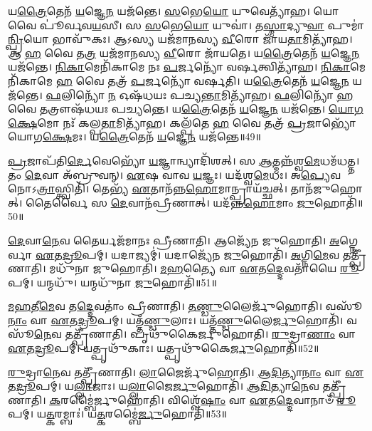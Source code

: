 𑌯\-\ul{𑌤𑍍𑌰𑍈}\-𑌤𑍇𑌨᳴ \ul{𑌯}\-𑌜𑍍𑌞𑍇\-\ul{𑌨} 𑌯𑌜᳴𑌨𑍍𑌤𑍇।
\-\ul{𑌸}\-𑌭𑍇\-\ul{𑌯𑍋} 𑌯𑍁𑌵𑍇𑌤𑍍𑌯𑌾᳴𑌹।
𑌯𑍋 𑌵𑍈 𑌪𑍂॑𑌰𑍍𑌵𑌵\-\ul{𑌯}\-𑌸𑍀।
𑌸 \ul{𑌸}\-𑌭𑍇\-\ul{𑌯𑍋} 𑌯𑍁𑌵𑌾॑।
𑌤\-\ul{𑌸𑍍𑌮𑌾}\-𑌦𑍍𑌯𑍁\-\ul{𑌵𑌾} 𑌪𑍁𑌮𑌾॑\-\ul{𑌨𑍍𑌪𑍍𑌰𑌿}\-𑌯𑍋 𑌭𑌾𑌵𑍁᳴𑌕𑌃।
𑌆𑌽𑌸𑍍𑌯 𑌯𑌜᳴𑌮𑌾𑌨𑌸𑍍𑌯 \ul{𑌵𑍀}\-𑌰𑍋 𑌜𑌾᳴𑌯\-\ul{𑌤𑌾}\-𑌮𑌿𑌤𑍍𑌯𑌾᳴𑌹।
𑌆 \ul{𑌹} 𑌵𑍈 𑌤\-\ul{𑌤𑍍𑌰} 𑌯𑌜᳴𑌮𑌾𑌨𑌸𑍍𑌯 \ul{𑌵𑍀}\-𑌰𑍋 𑌜𑌾᳴𑌯𑌤𑍇।
𑌯\-\ul{𑌤𑍍𑌰𑍈}\-𑌤𑍇𑌨᳴ \ul{𑌯}\-𑌜𑍍𑌞𑍇\-\ul{𑌨} 𑌯𑌜᳴𑌨𑍍𑌤𑍇।
\-\ul{𑌨𑌿}\-\-\ul{𑌕𑌾}\-𑌮𑍇𑌨𑌿᳴𑌕𑌾𑌮𑍇 𑌨𑌃 \ul{𑌪}\-𑌰𑍍𑌜𑌨𑍍𑌯𑍋᳴ 𑌵𑌰𑍍\mbox{}\-\ul{𑌷}\-𑌤𑍍𑌵𑌿𑌤𑍍𑌯𑌾᳴𑌹।
\-\ul{𑌨𑌿}\-\-\ul{𑌕𑌾}\-𑌮𑍇𑌨𑌿᳴𑌕𑌾𑌮𑍇 \ul{𑌹} 𑌵𑍈 𑌤𑌤𑍍𑌰᳴ \ul{𑌪}\-𑌰𑍍𑌜𑌨𑍍𑌯𑍋᳴ 𑌵𑌰𑍍\mbox{}𑌷𑌤𑌿।
𑌯\-\ul{𑌤𑍍𑌰𑍈}\-𑌤𑍇𑌨᳴ \ul{𑌯}\-𑌜𑍍𑌞𑍇\-\ul{𑌨} 𑌯𑌜᳴𑌨𑍍𑌤𑍇।
\-\ul{𑌫}\-𑌲𑌿𑌨𑍍𑌯𑍋᳴ \ul{𑌨} 𑌓𑌷᳴𑌧𑌯𑌃 𑌪𑌚𑍍𑌯\-\ul{𑌨𑍍𑌤𑌾}\-𑌮𑌿𑌤𑍍𑌯𑌾᳴𑌹।
\-\ul{𑌫}\-𑌲𑌿𑌨𑍍𑌯𑍋᳴ \ul{𑌹} 𑌵𑍈 𑌤𑌤𑍍𑌰𑍗𑌷᳴𑌧𑌯𑌃 𑌪𑌚𑍍𑌯𑌨𑍍𑌤𑍇।
𑌯\-\ul{𑌤𑍍𑌰𑍈}\-𑌤𑍇𑌨᳴ \ul{𑌯}\-𑌜𑍍𑌞𑍇\-\ul{𑌨} 𑌯𑌜᳴𑌨𑍍𑌤𑍇।
\-\ul{𑌯𑍋}\-\-\ul{𑌗}\-\-\ul{𑌕𑍍𑌷𑍇}\-𑌮𑍋 𑌨𑌃᳴ 𑌕𑌲𑍍𑌪\-\ul{𑌤𑌾}\-𑌮𑌿𑌤𑍍𑌯𑌾᳴𑌹।
𑌕𑌲𑍍𑌪᳴𑌤𑍇 \ul{𑌹} 𑌵𑍈 𑌤𑌤𑍍𑌰᳴ \ul{𑌪𑍍𑌰}\-𑌜𑌾𑌭𑍍𑌯𑍋᳴ 𑌯𑍋𑌗\-\ul{𑌕𑍍𑌷𑍇}\-𑌮𑌃।
𑌯\-\ul{𑌤𑍍𑌰𑍈}\-𑌤𑍇𑌨᳴ \ul{𑌯}\-𑌜𑍍𑌞𑍇\-\ul{𑌨} 𑌯𑌜᳴𑌨𑍍𑌤𑍇॥49॥\anuvakamend[\-\ul{𑌅}\-\-\ul{𑌨}\-𑌡𑍍𑌵𑌾𑌨𑌿𑌤𑍍𑌯𑌾᳴𑌹 𑌜𑌾𑌯𑌤𑍇 𑌵𑌰𑍍‌\mbox{}𑌷𑌤𑌿 \ul{𑌸}\-𑌪𑍍𑌤 𑌚᳴]

\-\ul{𑌪𑍍𑌰}\-𑌜𑌾𑌪᳴𑌤𑌿\-\ul{𑌰𑍍𑌦𑍇}\-𑌵𑍇𑌭𑍍𑌯𑍋᳴ \ul{𑌯}\-𑌜𑍍𑌞𑌾𑌨𑍍𑌵𑍍𑌯𑌾𑌦𑌿᳴𑌶𑌤𑍍।
𑌸 \ul{𑌆}\-𑌤𑍍𑌮𑌨𑍍𑌨᳴𑌶𑍍𑌵\-\ul{𑌮𑍇}\-𑌧𑌮᳴𑌧𑌤𑍍𑌤।
𑌤𑌂 \ul{𑌦𑍇}\-𑌵𑌾 𑌅᳴𑌬𑍍𑌰𑍁𑌵𑌨𑍍।
\-\ul{𑌏}\-𑌷 𑌵𑌾𑌵 \ul{𑌯}\-𑌜𑍍𑌞𑌃।
𑌯𑌦᳴𑌶𑍍𑌵\-\ul{𑌮𑍇}\-𑌧𑌃।
𑌅\-\ul{𑌪𑍍𑌯𑍇}\-𑌵 𑌨𑍋𑌽\-\ul{𑌤𑍍𑌰𑌾}\-𑌸𑍍𑌤𑍍𑌵𑌿𑌤𑌿᳴।
𑌤𑍇𑌭𑍍𑌯᳴ \ul{𑌏}\-𑌤𑌾𑌨᳴𑌨𑍍𑌨\-\ul{𑌹𑍋}\-𑌮𑌾𑌨𑍍𑌪𑍍𑌰𑌾𑌯᳴𑌚𑍍𑌛𑌤𑍍।
𑌤𑌾𑌨᳴𑌜𑍁𑌹𑍋𑌤𑍍।
𑌤𑍈𑌰𑍍𑌵𑍈 𑌸 \ul{𑌦𑍇}\-𑌵𑌾𑌨᳴𑌪𑍍𑌰𑍀𑌣𑌾𑌤𑍍।
𑌯𑌦᳴𑌨𑍍𑌨\-\ul{𑌹𑍋}\-𑌮𑌾𑌂 \ul{𑌜𑍁}\-𑌹𑍋𑌤𑌿᳴॥50॥

\-\ul{𑌦𑍇}\-𑌵𑌾\-\ul{𑌨𑍇}\-𑌵 𑌤𑍈𑌰𑍍𑌯𑌜᳴𑌮𑌾𑌨𑌃 𑌪𑍍𑌰𑍀𑌣𑌾𑌤𑌿।
𑌆𑌜𑍍𑌯𑍇᳴𑌨 𑌜𑍁𑌹𑍋𑌤𑌿।
\-\ul{𑌅}\-𑌗𑍍𑌨𑍇𑌰𑍍𑌵𑌾 \ul{𑌏}\-𑌤\-\ul{𑌦𑍍𑌰𑍂}\-𑌪𑌮𑍍।
𑌯𑌦𑌾𑌜𑍍𑌯𑌮𑍍॑।
𑌯𑌦𑌾𑌜𑍍𑌯𑍇᳴𑌨 \ul{𑌜𑍁}\-𑌹𑍋𑌤𑌿᳴।
\-\ul{𑌅}\-𑌗𑍍𑌨𑌿\-\ul{𑌮𑍇}\-𑌵 𑌤𑌤𑍍𑌪𑍍𑌰𑍀᳴𑌣𑌾𑌤𑌿।
𑌮𑌧𑍁᳴𑌨𑌾 𑌜𑍁𑌹𑍋𑌤𑌿।
\-\ul{𑌮}\-\-\ul{𑌹}\-𑌤𑍍𑌯𑍈 𑌵𑌾 \ul{𑌏}\-𑌤\-\ul{𑌦𑍍𑌦𑍇}\-𑌵𑌤𑌾᳴𑌯𑍈 \ul{𑌰𑍂}\-𑌪𑌮𑍍।
𑌯𑌨𑍍𑌮𑌧𑍁᳴।
𑌯𑌨𑍍𑌮𑌧𑍁᳴𑌨𑌾 \ul{𑌜𑍁}\-𑌹𑍋𑌤𑌿᳴॥51॥

\-\ul{𑌮}\-\-\ul{𑌹}\-𑌤𑍀\-\ul{𑌮𑍇}\-𑌵 𑌤\-\ul{𑌦𑍍𑌦𑍇}\-𑌵𑌤𑌾𑌂॑ 𑌪𑍍𑌰𑍀𑌣𑌾𑌤𑌿।
\-\ul{𑌤}\-\-\ul{𑌣𑍍𑌡𑍁}\-𑌲𑍈𑌰𑍍𑌜𑍁᳴𑌹𑍋𑌤𑌿।
𑌵𑌸𑍂᳴\-\ul{𑌨𑌾𑌂} 𑌵𑌾 \ul{𑌏}\-𑌤\-\ul{𑌦𑍍𑌰𑍂}\-𑌪𑌮𑍍।
𑌯𑌤𑍍𑌤᳴\-\ul{𑌣𑍍𑌡𑍁}\-𑌲𑌾𑌃।
𑌯𑌤𑍍𑌤᳴\-\ul{𑌣𑍍𑌡𑍁}\-𑌲𑍈\-\ul{𑌰𑍍𑌜𑍁}\-𑌹𑍋𑌤𑌿᳴।
𑌵𑌸𑍂᳴\-\ul{𑌨𑍇}\-𑌵 𑌤𑌤𑍍𑌪𑍍𑌰𑍀᳴𑌣𑌾𑌤𑌿।
𑌪𑍃𑌥𑍁᳴𑌕𑍈𑌰𑍍𑌜𑍁𑌹𑍋𑌤𑌿।
\-\ul{𑌰𑍁}\-𑌦𑍍𑌰𑌾\-\ul{𑌣𑌾𑌂} 𑌵𑌾 \ul{𑌏}\-𑌤\-\ul{𑌦𑍍𑌰𑍂}\-𑌪𑌮𑍍।
𑌯𑌤𑍍𑌪𑍃𑌥𑍁᳴𑌕𑌾𑌃।
𑌯𑌤𑍍𑌪𑍃𑌥𑍁᳴𑌕𑍈\-\ul{𑌰𑍍𑌜𑍁}\-𑌹𑍋𑌤𑌿᳴॥52॥

\-\ul{𑌰𑍁}\-𑌦𑍍𑌰𑌾\-\ul{𑌨𑍇}\-𑌵 𑌤𑌤𑍍𑌪𑍍𑌰𑍀᳴𑌣𑌾𑌤𑌿।
\-\ul{𑌲𑌾}\-𑌜𑍈𑌰𑍍𑌜𑍁᳴𑌹𑍋𑌤𑌿।
\-\ul{𑌆}\-\-\ul{𑌦𑌿}\-𑌤𑍍𑌯𑌾\-\ul{𑌨𑌾𑌂} 𑌵𑌾 \ul{𑌏}\-𑌤\-\ul{𑌦𑍍𑌰𑍂}\-𑌪𑌮𑍍।
𑌯\-\ul{𑌲𑍍𑌲𑌾}\-𑌜𑌾𑌃।
𑌯\-\ul{𑌲𑍍𑌲𑌾}\-𑌜𑍈\-\ul{𑌰𑍍𑌜𑍁}\-𑌹𑍋𑌤𑌿᳴।
\-\ul{𑌆}\-\-\ul{𑌦𑌿}\-𑌤𑍍𑌯𑌾\-\ul{𑌨𑍇}\-𑌵 𑌤𑌤𑍍𑌪𑍍𑌰𑍀᳴𑌣𑌾𑌤𑌿।
\-\ul{𑌕}\-𑌰𑌮𑍍𑌬𑍈॑𑌰𑍍𑌜𑍁𑌹𑍋𑌤𑌿।
𑌵𑌿𑌶𑍍𑌵𑍇᳴\-\ul{𑌷𑌾𑌂} 𑌵𑌾 \ul{𑌏}\-𑌤\-\ul{𑌦𑍍𑌦𑍇}\-𑌵𑌾𑌨𑌾𑍞᳴ \ul{𑌰𑍂}\-𑌪𑌮𑍍।
𑌯\-\ul{𑌤𑍍𑌕}\-𑌰𑌮𑍍𑌬𑌾𑌃॑।
𑌯\-\ul{𑌤𑍍𑌕}\-𑌰𑌮𑍍𑌬𑍈॑\-\ul{𑌰𑍍𑌜𑍁}\-𑌹𑍋𑌤𑌿᳴॥53॥


